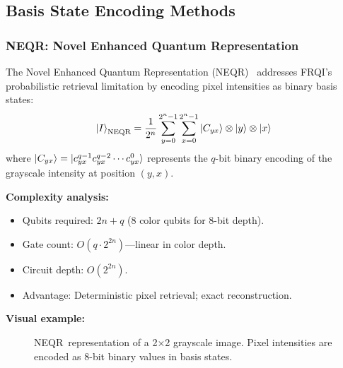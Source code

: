 \documentclass{ipol}
\newcommand{\frqi}{\textsc{FRQI}}
\newcommand{\neqr}{\textsc{NEQR}}
\begin{document}
\FloatBarrier
\subsection{Basis State Encoding Methods}

\FloatBarrier
\subsubsection{\neqr: Novel Enhanced Quantum Representation}

The Novel Enhanced Quantum Representation (\neqr)~\cite{ref4} addresses
\frqi's probabilistic retrieval limitation by encoding pixel intensities as
binary basis states:
\begin{equation}
\ket{I}_{\text{NEQR}} = \frac{1}{2^n} \sum_{y=0}^{2^n-1} \sum_{x=0}^{2^n-1}
  \ket{C_{yx}} \otimes \ket{y} \otimes \ket{x}
\label{eq:neqr_state}
\end{equation}
where $\ket{C_{yx}} = \ket{c_{yx}^{q-1} c_{yx}^{q-2} \cdots c_{yx}^0}$
represents the $q$-bit binary encoding of the grayscale intensity at
position $(y, x)$.

\textbf{Complexity analysis:}
\begin{itemize}
  \item Qubits required: $2n + q$ (8 color qubits for 8-bit depth).
  \item Gate count: $O(q \cdot 2^{2n})$---linear in color depth.
  \item Circuit depth: $O(2^{2n})$.
  \item Advantage: Deterministic pixel retrieval; exact reconstruction.
\end{itemize}

\textbf{Visual example:}
\begin{figure}[H]
\begin{center}
\caption{\neqr\ representation of a 2$\times$2 grayscale image. Pixel
  intensities are encoded as 8-bit binary values in basis states.}
\label{fig:neqr_example}
\end{center}
\end{figure}
\end{document}
